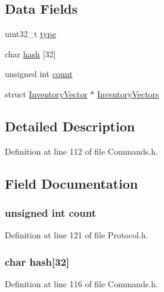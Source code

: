 \subsection*{Data Fields}
\begin{DoxyCompactItemize}
\item 
uint32\_\-t \hyperlink{struct_cmd_inv_ad44b615021ed3ccb734fcaf583ef4a03}{type}
\item 
char \hyperlink{struct_cmd_inv_a30660ee1bca7189182e64c5a192651af}{hash} \mbox{[}32\mbox{]}
\item 
unsigned int \hyperlink{struct_cmd_inv_a16ff2d8e15ade4948398b0aeb80124a8}{count}
\item 
struct \hyperlink{struct_inventory_vector}{InventoryVector} $\ast$ \hyperlink{struct_cmd_inv_ab98754c1df21fac25844fc908ecefe29}{InventoryVectors}
\end{DoxyCompactItemize}


\subsection{Detailed Description}


Definition at line 112 of file Commands.h.



\subsection{Field Documentation}
\hypertarget{struct_cmd_inv_a16ff2d8e15ade4948398b0aeb80124a8}{
\subsubsection[{count}]{\setlength{\rightskip}{0pt plus 5cm}unsigned int {\bf count}}}
\label{struct_cmd_inv_a16ff2d8e15ade4948398b0aeb80124a8}


Definition at line 121 of file Protocol.h.

\hypertarget{struct_cmd_inv_a30660ee1bca7189182e64c5a192651af}{
\subsubsection[{hash}]{\setlength{\rightskip}{0pt plus 5cm}char {\bf hash}\mbox{[}32\mbox{]}}}
\label{struct_cmd_inv_a30660ee1bca7189182e64c5a192651af}


Definition at line 116 of file Commands.h.

